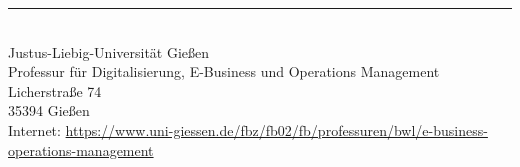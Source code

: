 \begin{titlepage}
\begin{center}
  \rule{\textwidth}{.4pt}\\ %
  Justus-Liebig-Universität Gießen\\
  Professur für Digitalisierung, E-Business und Operations Management\\
  Licherstraße 74 \\
  35394  Gießen\\
  \small Internet: \url{https://www.uni-giessen.de/fbz/fb02/fb/professuren/bwl/e-business-operations-management}
\end{center}

\end{titlepage} %

